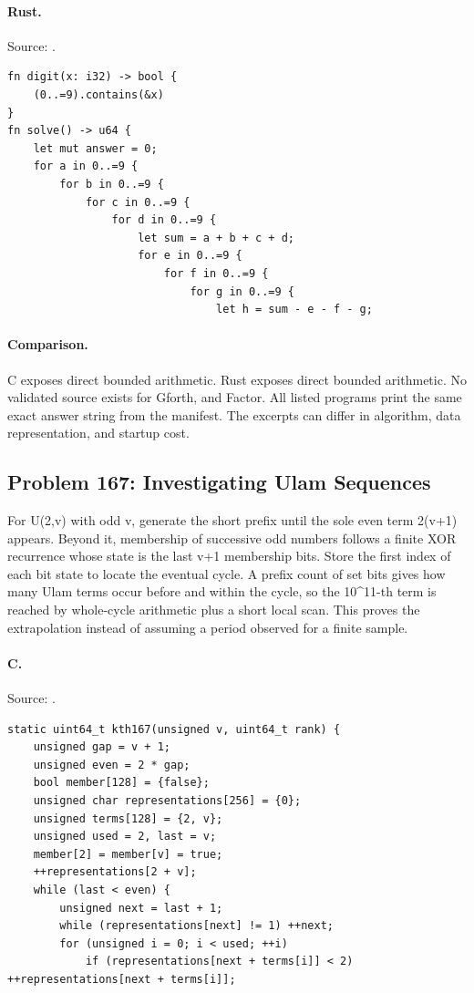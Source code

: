 \paragraph{Rust.} Source: .
\begin{lstlisting}
fn digit(x: i32) -> bool {
    (0..=9).contains(&x)
}
fn solve() -> u64 {
    let mut answer = 0;
    for a in 0..=9 {
        for b in 0..=9 {
            for c in 0..=9 {
                for d in 0..=9 {
                    let sum = a + b + c + d;
                    for e in 0..=9 {
                        for f in 0..=9 {
                            for g in 0..=9 {
                                let h = sum - e - f - g;
\end{lstlisting}

\paragraph{Comparison.}
C exposes direct bounded arithmetic. Rust exposes direct bounded arithmetic.
No validated source exists for Gforth, and Factor.
All listed programs print the same exact answer string from the manifest. The excerpts can differ in algorithm, data representation, and startup cost.

\subsection{Problem 167: Investigating Ulam Sequences}
\label{walkthrough:p167}
For U(2,v) with odd v, generate the short prefix until the sole even term 2(v+1) appears. Beyond it, membership of successive odd numbers follows a finite XOR recurrence whose state is the last v+1 membership bits. Store the first index of each bit state to locate the eventual cycle. A prefix count of set bits gives how many Ulam terms occur before and within the cycle, so the 10\textasciicircum{}11-th term is reached by whole-cycle arithmetic plus a short local scan. This proves the extrapolation instead of assuming a period observed for a finite sample.

\paragraph{C.} Source: .
\begin{lstlisting}
static uint64_t kth167(unsigned v, uint64_t rank) {
    unsigned gap = v + 1;
    unsigned even = 2 * gap;
    bool member[128] = {false};
    unsigned char representations[256] = {0};
    unsigned terms[128] = {2, v};
    unsigned used = 2, last = v;
    member[2] = member[v] = true;
    ++representations[2 + v];
    while (last < even) {
        unsigned next = last + 1;
        while (representations[next] != 1) ++next;
        for (unsigned i = 0; i < used; ++i)
            if (representations[next + terms[i]] < 2) ++representations[next + terms[i]];
\end{lstlisting}

